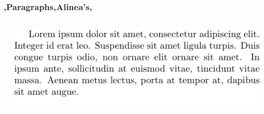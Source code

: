 \begin{frame}
    \frametitle{\lang,Paragraphs,Alinea's,}
    
    \begin{columns}
        \begin{column}{0.5\textwidth}
        \end{column}
        \begin{column}{0.5\textwidth}
            \includegraphics[width=\linewidth,height=0.5\textheight,keepaspectratio]{assets/singleParagraph2.pdf}
        \end{column}
    \end{columns}
    \pause
    \begin{columns}
        \begin{column}{0.5\textwidth}
        \end{column}
        \begin{column}{0.5\textwidth}
        \end{column}
    \end{columns}
    \pause
\end{frame}
